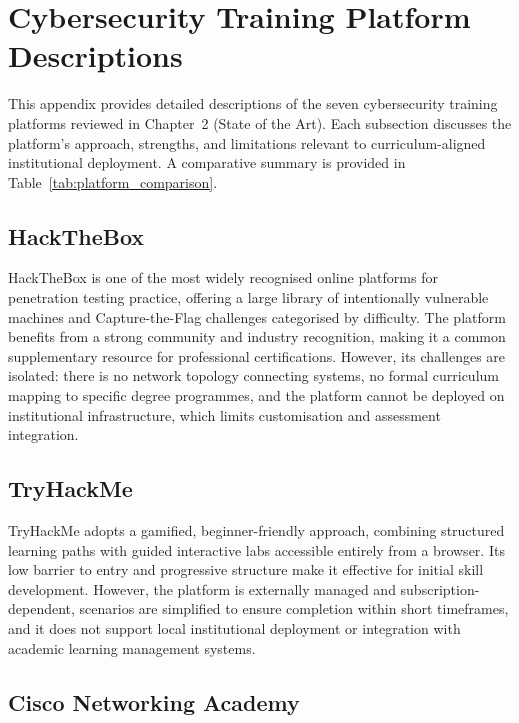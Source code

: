 
\chapter{Cybersecurity Training Platform Descriptions}
\label{app:platforms}

This appendix provides detailed descriptions of the seven cybersecurity training platforms
reviewed in Chapter~2 (State of the Art). Each subsection discusses the platform's approach,
strengths, and limitations relevant to curriculum-aligned institutional deployment.
A comparative summary is provided in Table~\ref{tab:platform_comparison}.

\section{HackTheBox}

HackTheBox \cite{hackthebox} is one of the most widely recognised online platforms for
penetration testing practice, offering a large library of intentionally vulnerable machines and
Capture-the-Flag challenges categorised by difficulty. The platform benefits from a strong
community and industry recognition, making it a common supplementary resource for
professional certifications. However, its challenges are isolated: there is no network topology
connecting systems, no formal curriculum mapping to specific degree programmes, and the
platform cannot be deployed on institutional infrastructure, which limits customisation and
assessment integration.

\section{TryHackMe}

TryHackMe \cite{tryhackme} adopts a gamified, beginner-friendly approach, combining structured
learning paths with guided interactive labs accessible entirely from a browser. Its low barrier to
entry and progressive structure make it effective for initial skill development. However, the
platform is externally managed and subscription-dependent, scenarios are simplified to ensure
completion within short timeframes, and it does not support local institutional deployment or
integration with academic learning management systems.

\section{Cisco Networking Academy}

